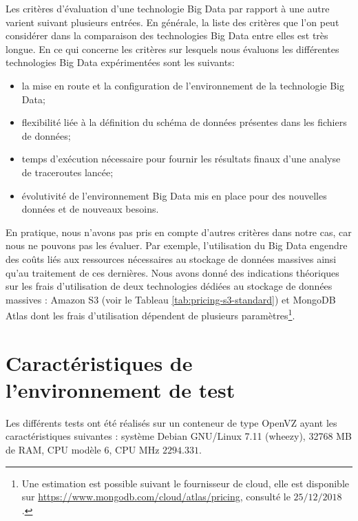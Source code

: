 Les critères d'évaluation d'une technologie Big Data par rapport à une autre varient  suivant plusieurs entrées.  En générale, la liste des critères que l'on peut considérer dans la comparaison des technologies Big Data entre elles est très longue.  En ce qui concerne les critères sur lesquels nous  évaluons  les différentes technologies  Big Data expérimentées sont les suivants:
\begin{itemize}
\item la mise en route et la configuration de l'environnement de la technologie Big Data;
\item flexibilité liée à la définition du  schéma de  données présentes dans les fichiers de données;
\item temps d'exécution nécessaire pour fournir les résultats finaux d'une analyse de traceroutes lancée;
\item évolutivité de l'environnement Big Data mis en place pour des nouvelles données et de nouveaux besoins.

\end{itemize}
En pratique, nous n'avons pas pris en compte d'autres critères dans notre cas, car nous ne pouvons pas les évaluer. Par exemple, l'utilisation du  Big Data engendre des coûts  liés aux ressources nécessaires au stockage de données massives ainsi qu'au traitement de ces dernières. Nous avons donné des indications théoriques sur les frais d'utilisation de deux technologies dédiées au stockage de données massives : Amazon S3 (voir le Tableau \ref{tab:pricing-s3-standard}) et MongoDB Atlas dont les frais d'utilisation  dépendent de plusieurs paramètres\footnote{Une estimation est possible suivant le fournisseur de cloud, elle est disponible  sur \url{https://www.mongodb.com/cloud/atlas/pricing}, consulté le $25/12/2018$.}. 

\section{Caractéristiques de l'environnement de test}

Les différents tests ont été réalisés sur un conteneur de type OpenVZ ayant les caractéristiques suivantes :  système Debian GNU/Linux 7.11 (wheezy),  32768 MB de  RAM,  CPU  modèle $6$, CPU MHz $ 2294.331 $.




